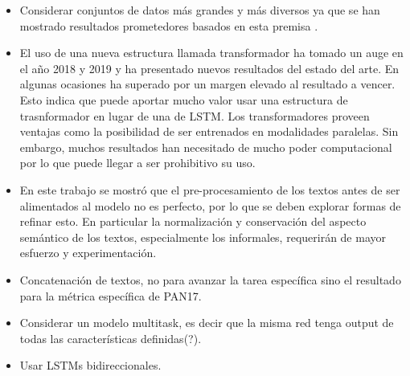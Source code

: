 \begin{itemize}

\item Considerar conjuntos de datos más grandes y más diversos ya que se han mostrado resultados prometedores basados en esta premisa \parencite{radford2019language}.

\item El uso de una nueva estructura llamada transformador ha tomado un auge en el año 2018 y 2019 y ha presentado nuevos resultados del estado del arte. En algunas ocasiones ha superado por un margen elevado al resultado a vencer. Esto indica que puede aportar mucho valor usar una estructura de trasnformador en lugar de una de LSTM. Los transformadores proveen ventajas como la posibilidad de ser entrenados en modalidades paralelas. Sin embargo, muchos resultados han necesitado de mucho poder computacional por lo que puede llegar a ser prohibitivo su uso.

\item En este trabajo se mostró que el pre-procesamiento de los textos antes de ser alimentados al modelo no es perfecto, por lo que se deben explorar formas de refinar esto. En particular la normalización y conservación del aspecto semántico de los textos, especialmente los informales, requerirán de mayor esfuerzo y experimentación.

\item Concatenación de textos, no para avanzar la tarea específica sino el resultado para la métrica específica de PAN17.

\item Considerar un modelo multitask, es decir que la misma red tenga output de todas las características definidas(?).

\item Usar LSTMs bidireccionales.


\end{itemize}

